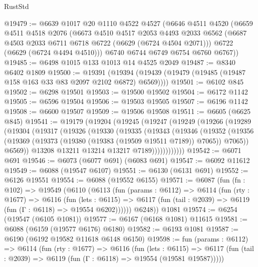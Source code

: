 \begin{lexlean}{RustStd}
\begin{coremodule}
@19479 := @6639
    @1017
    @20
    @1110
    @4522
    @4527
    (@6646
      @4511
      @4520
      (@6659
        @4511
        @4518
        @2076
        (@6673
          @4510
          @4517
          @2053
          @4493
          @2033
          @6562
          (@6687 @4503 @2033 @6711 @6718 @6722 (@6629 (@6724 @4504 @2071)))
          @6722
          (@6629 (@6724 @4494 @4510)))
        @6740
        @6744
        @6749
        @6754
        @6760
        @6767))
@19485 := @6498 @1015 @133 @1013 @14 @4525 @2049
@19487 := @8340 @6402 @1809
@19500 := @19391
    (@19394 (@19439 (@19479 (@19485 (@19487 @158 @163 @33 @83 @2097 @2102 @6872) @6569))))
@19501 := @6102 @845
@19502 := @6298 @19501
@19503 := @19500 @19502
@19504 := @6172 @1142
@19505 := @6596 @19504
@19506 := @19503 @19505
@19507 := @6196 @1142
@19508 := @6600 @19507
@19509 := @19506 @19508
@19511 := @6605 (@6625 @845)
@19541 := @19179
    (@19204
      (@19245
        (@19247
          (@19249
            (@19266
              (@19289
                (@19304
                  (@19317
                    (@19326
                      (@19330
                        (@19335
                          (@19343
                            (@19346
                              (@19352
                                (@19356
                                  (@19369
                                    (@19373 (@19380 (@19383 (@19509 @19511 @7189)) @7065))
                                    @7065))
                                @6569))
                            @13208
                            @13211
                            @13214
                            @13217
                            @7189))))))))))))
@19542 := @6071 @691
@19546 := @6073 (@6077 @691) (@6083 @691)
@19547 := @6092 @11612
@19549 := @6088 (@19547 @6107)
@19551 := @6130 (@6131 @691)
@19552 := @6126 @19551
@19554 := @6088 (@19552 @6155)
@19571 := @6087
    (fun (fn : @102) =>
    @19549
      (@6110
        (@6113
          (fun (params : @6112) =>
          @6114
            (fun (rty : @1677) =>
            @6116
              (fun (lets : @6115) =>
              @6117 (fun (tail : @2039) => @6119 (fun (Γ : @6118) => @19554 @6202))))))
        @6248))
    @1081
@19574 := @6254 (@19547 (@6105 @1081))
@19577 := @6167 (@6168 @1081) @11615
@19581 := @6088 (@6159 (@19577 @6176) @6180)
@19582 := @6193 @1081
@19587 := @6190 (@6192 @19582 @11618 @6148 @6150)
@19598 := fun (params : @6112) =>
  @6114
    (fun (rty : @1677) =>
    @6116
      (fun (lets : @6115) =>
      @6117 (fun (tail : @2039) => @6119 (fun (Γ : @6118) => @19554 (@19581 @19587)))))

\end{coremodule}
\end{lexlean}
